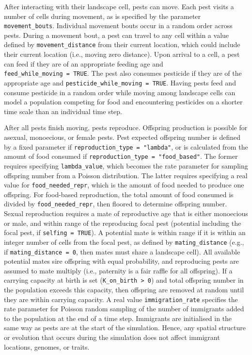\documentclass[
]{article}
\begin{document}
After interacting with their landscape cell, pests can move.
Each pest visits a number of cells during movement, as is specified by the parameter \texttt{movement\_bouts}.
Individual movement bouts occur in a random order across pests.
During a movement bout, a pest can travel to any cell within a value defined by \texttt{movement\_distance} from their current location, which could include their current location (i.e., moving zero distance).
Upon arrival to a cell, a pest can feed if they are of an appropriate feeding age and \texttt{feed\_while\_moving\ =\ TRUE}.
The pest also consumes pesticide if they are of the appropriate age and \texttt{pesticide\_while\_moving\ =\ TRUE}.
Having pests feed and consume pesticide in a random order while moving among landscape cells can model a population competing for food and encountering pesticides on a shorter time scale than an individual time step.

After all pests finish moving, pests reproduce.
Offspring production is possible for asexual, monoecious, or female pests.
Pest expected offspring number is defined by a fixed parameter if \texttt{reproduction\_type\ =\ "lambda"}, or is calculated from the amount of food consumed if \texttt{reproduction\_type\ =\ "food\_based"}.
The former requires specifying \texttt{lambda\_value}, which becomes the rate parameter for sampling offspring number from a Poisson distribution.
The latter requires specifying a real value for \texttt{food\_needed\_repr}, which is the amount of food needed to produce one offspring.
For food-based reproduction, the total amount of food consumed is divided by \texttt{food\_needed\_repr}, then floored to determine offspring number.
Sexual reproduction requires a mate of reproductive age that is either monoecious or male, and within range of the reproducing focal pest (potential including the focal pest, if \texttt{selfing\ =\ TRUE}).
A potential mate is within range if it is within an integer number of cells from the focal pest, as defined by \texttt{mating\_distance} (e.g., if \texttt{mating\_distance\ =\ 0}, then mates must share a landscape cell).
All available potential mates sire offspring with equal probability, and reproducing pests are assumed to mate multiply (i.e., paternity is a fair raffle for all offspring).
If a carrying capacity at birth is set (\texttt{K\_on\_birth\ \textgreater{}\ 0}) and total offspring number in the population exceeds this capacity, then offspring are removed at random until they are within carrying capacity.
A real value \texttt{immigration\_rate} specifies the rate parameter for Poisson random sampling of the number of immigrants added to the population at the end of a time step.
Immigrants are initialised in the same way as pests are at the start of the simulation.
Hence, any spatial structure or evolution that occurs during the simulation does not affect immigrant locations, genomes, or traits.
\end{document}
